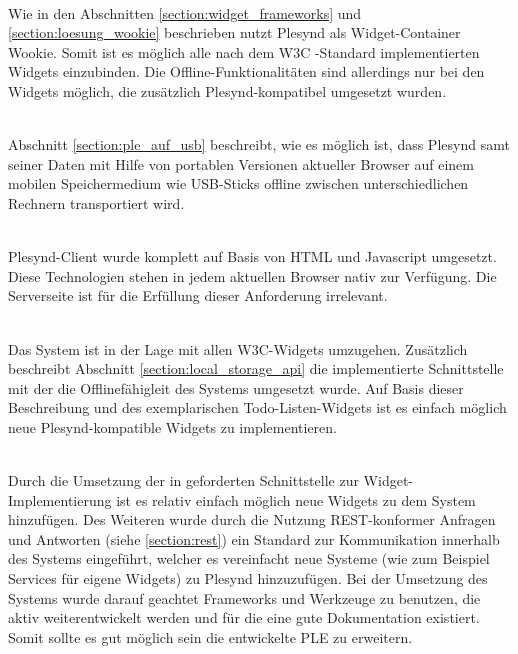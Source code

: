 \textbullet{}  \emph{\requirementWidgetStandard}\\
Wie in den Abschnitten \ref{section:widget_frameworks} und \ref{section:loesung_wookie} beschrieben nutzt Plesynd als Widget-Container Wookie. Somit ist es möglich alle nach dem W3C -Standard implementierten Widgets einzubinden. Die Offline-Funktionalitäten sind allerdings nur bei den Widgets möglich, die zusätzlich Plesynd-kompatibel umgesetzt wurden.

\textbullet{}  \emph{\requirementUsbStick}\\
Abschnitt \ref{section:ple_auf_usb} beschreibt, wie es möglich ist, dass Plesynd samt seiner Daten mit Hilfe von portablen Versionen aktueller Browser auf einem mobilen Speichermedium wie USB-Sticks offline zwischen unterschiedlichen Rechnern transportiert wird.

\textbullet{}  \emph{\requirementUsageInBrowser}\\
Plesynd-Client wurde komplett auf Basis von HTML und Javascript umgesetzt. Diese Technologien stehen in jedem aktuellen Browser nativ zur Verfügung. Die Serverseite ist für die Erfüllung dieser Anforderung irrelevant.

\textbullet{}  \emph{\requirementNewWidgetsWithApi}\\
Das System ist in der Lage mit allen W3C-Widgets umzugehen. Zusätzlich beschreibt Abschnitt \ref{section:local_storage_api} die implementierte Schnittstelle mit der die Offlinefähigleit des Systems umgesetzt wurde. Auf Basis dieser Beschreibung und des exemplarischen Todo-Listen-Widgets ist es einfach möglich neue Plesynd-kompatible Widgets zu implementieren.

\textbullet{}  \emph{\requirementExtensibility}\\
Durch die Umsetzung der in  geforderten Schnittstelle zur Widget-Implementierung ist es relativ einfach möglich neue Widgets zu dem System hinzufügen. Des Weiteren wurde durch die Nutzung REST-konformer Anfragen und Antworten (siehe \ref{section:rest}) ein Standard zur Kommunikation innerhalb des Systems eingeführt, welcher es vereinfacht neue Systeme (wie zum Beispiel Services für eigene Widgets) zu Plesynd hinzuzufügen. Bei der Umsetzung des Systems wurde darauf geachtet Frameworks und Werkzeuge zu benutzen, die aktiv weiterentwickelt werden und für die eine gute Dokumentation existiert. Somit sollte es gut möglich sein die entwickelte PLE zu erweitern.

